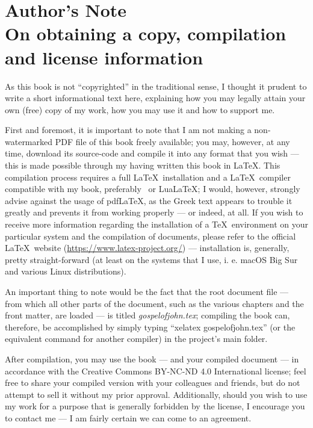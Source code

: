 \chapter*{Author's Note  \\ \large On obtaining a copy, compilation and license information}

As this book is not “copyrighted” in the traditional sense, I thought it prudent to write a short informational text here, explaining how you may legally attain your own (free) copy of my work, how you may use it and how to support me. 

First and foremost, it is important to note that I am not making a non-watermarked PDF file of this book freely available; you may, however, at any time, download its source-code and compile it into any format that you wish — this is made possible through my having written this book in \LaTeX. This compilation process requires a full \LaTeX\ installation and a \LaTeX\ compiler compatible with my book, preferably \XeLaTeX\ or Lua\LaTeX; I would, however, strongly advise against the usage of pdf\LaTeX, as the Greek text appears to trouble it greatly and prevents it from working properly — or indeed, at all. If you wish to receive more information regarding the installation of a \TeX\ environment on your particular system and the compilation of documents, please refer to the official \LaTeX\ website (\url{https://www.latex-project.org/}) — installation is, generally, pretty straight-forward (at least on the systems that I use, i. e. macOS Big Sur and various Linux distributions). 

An important thing to note would be the fact that the root document file — from which all other parts of the document, such as the various chapters and the front matter, are loaded — is titled \textit{gospelofjohn.tex}; compiling the book can, therefore, be accomplished by simply typing “xelatex gospelofjohn.tex” (or the equivalent command for another compiler) in the project's main folder. 

After compilation, you may use the book — and your compiled document — in accordance with the Creative Commons BY-NC-ND 4.0 International license; feel free to share your compiled version with your colleagues and friends, but do not attempt to sell it without my prior approval. Additionally, should you wish to use my work for a purpose that is generally forbidden by the license, I encourage you to contact me — I am fairly certain we can come to an agreement.

